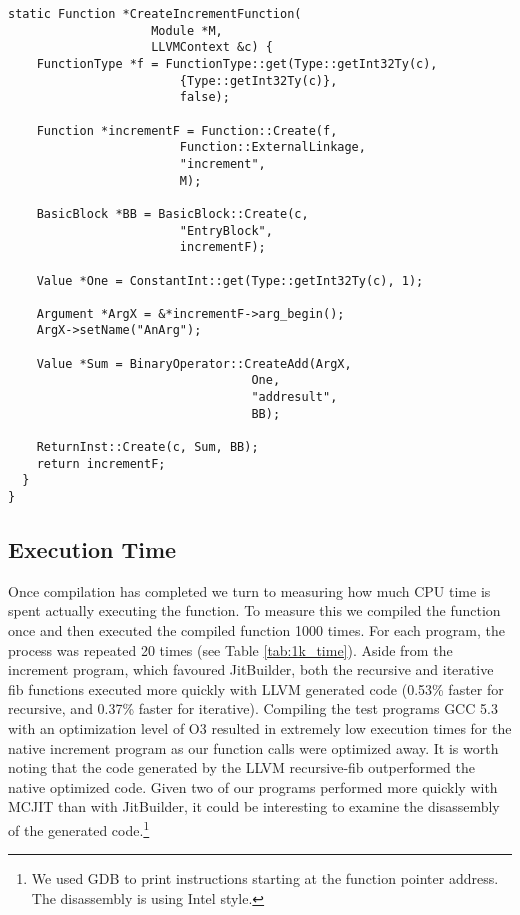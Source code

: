 \begin{lstlisting}[float,floatplacement=H,
  caption={Generating MCJIT IR for the increment program.},
  label=lst:llvm_increment]
  static Function *CreateIncrementFunction(
                    Module *M, 
                    LLVMContext &c) {
    FunctionType *f = FunctionType::get(Type::getInt32Ty(c), 
                        {Type::getInt32Ty(c)}, 
                        false);
    
    Function *incrementF = Function::Create(f, 
                        Function::ExternalLinkage, 
                        "increment", 
                        M);

    BasicBlock *BB = BasicBlock::Create(c, 
                        "EntryBlock", 
                        incrementF);
    
    Value *One = ConstantInt::get(Type::getInt32Ty(c), 1);
    
    Argument *ArgX = &*incrementF->arg_begin(); 
    ArgX->setName("AnArg");
  
    Value *Sum = BinaryOperator::CreateAdd(ArgX, 
                                  One,
                                  "addresult", 
                                  BB);
  
    ReturnInst::Create(c, Sum, BB);
    return incrementF;
  }
}\end{lstlisting}

\subsection{Execution Time}
Once compilation has completed we turn to measuring how much CPU time is spent actually executing the function.
To measure this we compiled the function once and then executed the compiled function 1000 times.
For each program, the process was repeated 20 times (see Table \ref{tab:1k_time}).
Aside from the increment program, which favoured JitBuilder, both the recursive and iterative fib functions executed more quickly with LLVM generated code (0.53\% faster for recursive, and 0.37\% faster for iterative).
Compiling the test programs GCC 5.3 with an optimization level of O3 resulted in extremely low execution times for the native increment program as our function calls were optimized away.
It is worth noting that the code generated by the LLVM recursive-fib outperformed the native optimized code.
Given two of our programs performed more quickly with MCJIT than with JitBuilder, it could be interesting to examine the disassembly of the generated code.\footnote{We used GDB to print instructions starting at the function pointer address. The disassembly is using Intel style.}

